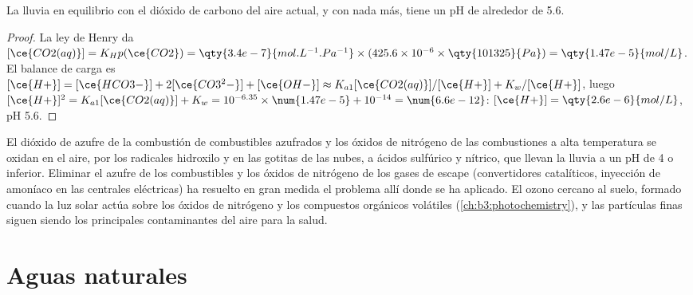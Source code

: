 \begin{proposition}\label{prop:b3:environmental-toxicology:rain-ph}
La lluvia en equilibrio con el dióxido de carbono del aire actual, y con nada
más, tiene un pH de alrededor de 5.6.
\end{proposition}

\begin{proof}
La ley de Henry da $[\ce{CO2(aq)}] = K_Hp(\ce{CO2}) = \qty{3.4e-7}{mol.L^{-1}.Pa^{-1}} \times (425.6 \times 10^{-6} \times \qty{101325}{Pa}) = \qty{1.47e-5}{mol/L}$. El
balance de carga es $[\ce{H+}] = [\ce{HCO3-}] + 2[\ce{CO3^2-}] + [\ce{OH-}] \approx K_{a1}[\ce{CO2(aq)}]/[\ce{H+}] + K_w/[\ce{H+}]$, luego
$[\ce{H+}]^2 = K_{a1}[\ce{CO2(aq)}] + K_w = 10^{-6.35} \times \num{1.47e-5} + 10^{-14} = \num{6.6e-12}$: $[\ce{H+}] = \qty{2.6e-6}{mol/L}$, pH 5.6.
\end{proof}

El dióxido de azufre de la combustión de combustibles azufrados y los óxidos de nitrógeno de las
combustiones a alta temperatura se oxidan en el aire, por los radicales hidroxilo y en las gotitas
de las nubes, a ácidos sulfúrico y nítrico, que llevan la lluvia a un pH de 4 o inferior.
Eliminar el azufre de los combustibles y los óxidos de nitrógeno de los gases de escape (convertidores
catalíticos, inyección de amoníaco en las centrales eléctricas) ha resuelto en gran medida el problema
allí donde se ha aplicado. El ozono cercano al suelo, formado cuando la luz solar actúa sobre los
óxidos de nitrógeno y los compuestos orgánicos volátiles (\cref{ch:b3:photochemistry}), y
las partículas finas siguen siendo los principales contaminantes del aire para la salud.

\section{Aguas naturales}

